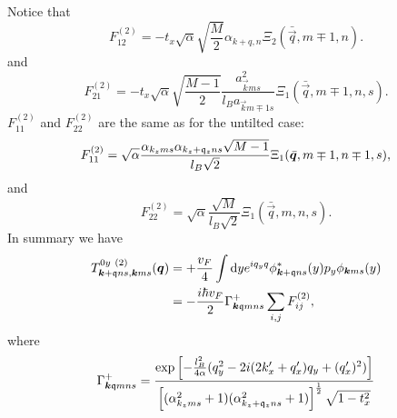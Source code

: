 Notice that
\begin{equation}
  F^{(2)}_{12}
  = -t_x \sqrt{\alpha}  \sqrt{\frac{M}{2}} \alpha_{k+q, n} \Xi_2(\bar{\vec{q}}, m\mp 1, n).
\end{equation}
and
\begin{equation}
  \label{eq:148}
  F^{(2)}_{21}
  =
  -t_{x} \sqrt{\alpha} \sqrt{\frac{M-1}{2}} \frac{a_{\vec{k} m s}^2}{l_B a_{\vec{k} m \mp 1 s}}
  \Xi_{1} (\bar{\vec{q}}, m \mp 1, n, s).
\end{equation}
\( F^{(2)}_{11} \) and \( F^{(2)}_{22} \) are the same as for the untilted case:
\begin{equation}
  \label{eq:149}
  F^{(2)}_{11} = \sqrt{\alpha}  \frac{\alpha_{k_z m s} \alpha_{k_z + \mathfrak{q}_z ns} \sqrt{M-1} }{ l_B \sqrt{2} }
  \Xi_{1} (\bar{\bm{q}}, m\mp 1, n\mp 1, s),
\end{equation}
and
\begin{equation}
  \label{eq:150}
  F^{(2)}_{22} =
  \sqrt{\alpha }
  \frac{\sqrt{M} }{l_B \sqrt{2} }
  \Xi_{1} ( \bar{\vec{q}}, m, n, s ).
\end{equation}
In summary we have
\begin{align}
  \label{eq:151}
  T^{0y~(2)}_{\bm{k} + \mathfrak{q} ns, \bm{k} ms} (\bm{q}) &= + \frac{v_F}{4} \int \mathrm{d} y
  e^{i q_y q} \phi _{\bm{k} + \mathfrak{q} ns}^{*} (y) p_{y} \phi _{\bm{k} ms} (y)\\
&= -\frac{ i \hbar v_{F} }{2}
                                                                                     \Gamma _{\bm{k} \mathfrak{q} m n s}^+
\sum\limits_{i,j}^{} F^{(2)}_{ij},
\end{align}
where
\[
  \Gamma _{\bm{k} \mathfrak{q} m n s}^+ =
  \frac{
  \exp
  \left[
    - \frac{l_{B}^2}{4 \alpha } (q_{y}^2 - 2 i (2k' _x + q' _x) q_{y} + (q' _x)^2 )
  \right  ]
}{
  \left[(\alpha_{k_z m s}^2 +1) (\alpha_{k_z + \mathfrak{q}_z ns} ^2 + 1)\right]^{\frac{1}{2}}
  \sqrt{1 - t_x^2 }}
\]

